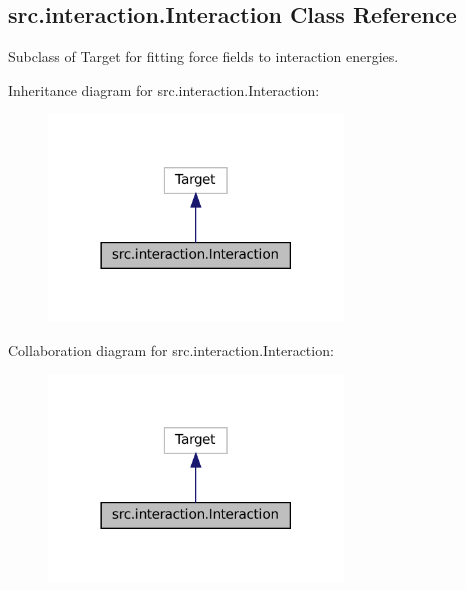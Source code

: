 \hypertarget{classsrc_1_1interaction_1_1Interaction}{}\subsection{src.\+interaction.\+Interaction Class Reference}
\label{classsrc_1_1interaction_1_1Interaction}


Subclass of Target for fitting force fields to interaction energies.  




Inheritance diagram for src.\+interaction.\+Interaction\+:
\nopagebreak
\begin{figure}[H]
\begin{center}
\leavevmode
\includegraphics[width=222pt]{classsrc_1_1interaction_1_1Interaction__inherit__graph}
\end{center}
\end{figure}


Collaboration diagram for src.\+interaction.\+Interaction\+:
\nopagebreak
\begin{figure}[H]
\begin{center}
\leavevmode
\includegraphics[width=222pt]{classsrc_1_1interaction_1_1Interaction__coll__graph}
\end{center}
\end{figure}
